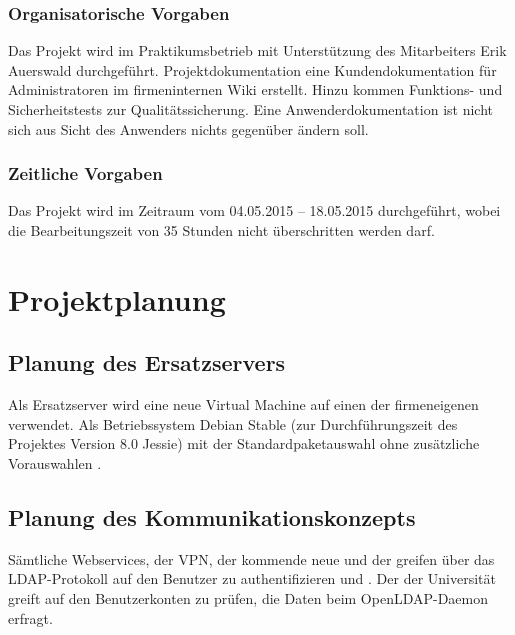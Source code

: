 \documentclass[11pt,a4paper,titlepage=firstiscover]{scrartcl} %
\begin{document}
\subsubsection{Organisatorische Vorgaben}
Das Projekt wird im Praktikumsbetrieb mit Unterstützung des Mitarbeiters Erik 
Auerswald durchgeführt.  Projektdokumentation  eine Kundendokumentation für 
Administratoren im firmeninternen Wiki erstellt. Hinzu kommen Funktions- und 
Sicherheitstests zur Qualitätssicherung. Eine Anwenderdokumentation ist nicht 
 sich aus Sicht des Anwenders nichts gegenüber  ändern soll.

\subsubsection{Zeitliche Vorgaben}
Das Projekt wird im Zeitraum vom 04.05.2015 – 18.05.2015 durchgeführt, wobei 
die Bearbeitungszeit von 35 Stunden nicht überschritten werden darf.

\section{Projektplanung}
\subsection{Planung des Ersatzservers}
Als Ersatzserver wird eine neue Virtual Machine auf einen der firmeneigenen 
 verwendet. Als Betriebssystem  Debian Stable (zur 
Durchführungszeit des Projektes Version 8.0 Jessie) mit der Standardpaketauswahl 
ohne zusätzliche Vorauswahlen .

\subsection{Planung des Kommunikationskonzepts}
Sämtliche  Webservices, der VPN, der 
kommende neue  und der  greifen über 
das LDAP-Protokoll auf den   Benutzer zu 
authentifizieren und . Der  der Universität greift auf 
den   Benutzerkonten zu prüfen,  die  Daten beim 
OpenLDAP-Daemon erfragt.
\end{document}

